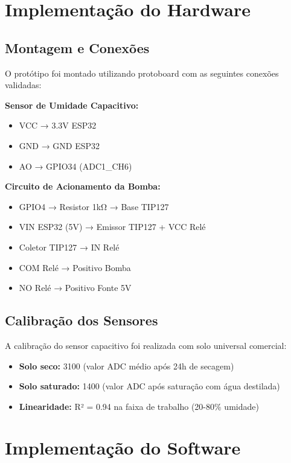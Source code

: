 \documentclass[twoside,english,brazilian]{UNISINOSmonografia}
\begin{document}
\section{Implementação do Hardware}

\subsection{Montagem e Conexões}
O protótipo foi montado utilizando protoboard com as seguintes conexões validadas:

\textbf{Sensor de Umidade Capacitivo:}
\begin{itemize}
    \item VCC → 3.3V ESP32
    \item GND → GND ESP32  
    \item AO → GPIO34 (ADC1\_CH6)
\end{itemize}

\textbf{Circuito de Acionamento da Bomba:}
\begin{itemize}
    \item GPIO4 → Resistor 1kΩ → Base TIP127
    \item VIN ESP32 (5V) → Emissor TIP127 + VCC Relé
    \item Coletor TIP127 → IN Relé
    \item COM Relé → Positivo Bomba
    \item NO Relé → Positivo Fonte 5V
\end{itemize}

\subsection{Calibração dos Sensores}
A calibração do sensor capacitivo foi realizada com solo universal comercial:
\begin{itemize}
    \item \textbf{Solo seco:} 3100 (valor ADC médio após 24h de secagem)
    \item \textbf{Solo saturado:} 1400 (valor ADC após saturação com água destilada)
    \item \textbf{Linearidade:} R² = 0.94 na faixa de trabalho (20-80\% umidade)
\end{itemize}

\section{Implementação do Software}
\end{document}

